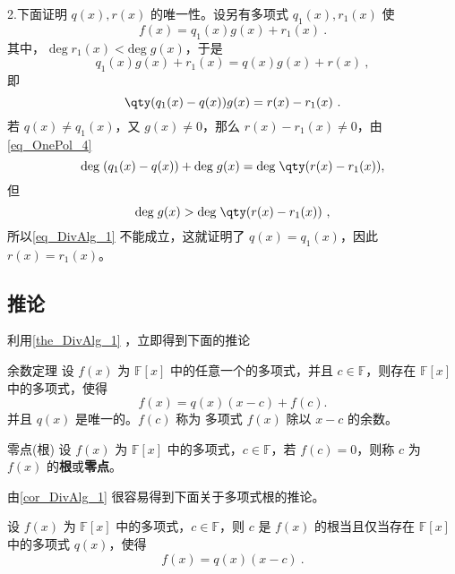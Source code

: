 2.下面证明 $q(x),r(x)$ 的唯一性。设另有多项式 $q_1(x),r_1(x)$ 使
\begin{equation}
f(x)=q_1(x)g(x)+r_1(x)~.
\end{equation}
其中， $\mathrm{deg}\;r_1(x)<\mathrm{deg}\;g(x)$，于是
\begin{equation}
q_1(x)g(x)+r_1(x)=q(x)g(x)+r(x)~,
\end{equation}
即
\begin{equation}
\qty(q_1(x)-q(x))g(x)=r(x)-r_1(x)~.
\end{equation}
若 $q(x)\neq q_1(x)$，又 $g(x)\neq 0$，那么 $r(x)-r_1(x)\neq 0$，由\autoref{eq_OnePol_4}~
\begin{equation}\label{eq_DivAlg_1}
\mathrm{deg}\;(q_1(x)-q(x))+\mathrm{deg}\;g(x)=\mathrm{deg}\;\qty(r(x)-r_1(x)),
\end{equation}
但
\begin{equation}
\mathrm{deg}\;g(x)>\mathrm{deg}\;\qty(r(x)-r_1(x))~,
\end{equation}
所以\autoref{eq_DivAlg_1} 不能成立，这就证明了
$q(x)=q_1(x)$，因此 $r(x)=r_1(x)$。
\subsection{推论}
利用\autoref{the_DivAlg_1} ，立即得到下面的推论
\begin{corollary}{余数定理}\label{cor_DivAlg_1}
设 $f(x)$ 为 $\mathbb{F}[x]$ 中的任意一个的多项式，并且 $c\in\mathbb{F}$，则存在 $\mathbb{F}[x]$ 中的多项式，使得
\begin{equation}
f(x)=q(x)(x-c)+f(c).
\end{equation}
并且 $q(x)$ 是唯一的。$f(c)$ 称为 多项式 $f(x)$ 除以 $x-c$ 的余数。
\end{corollary}
\begin{definition}{零点(根)}
设 $f(x)$ 为 $\mathbb{F}[x]$ 中的多项式，$c\in\mathbb{F}$，若 $f(c)=0$，则称 $c$ 为 $f(x)$ 的\textbf{根}或\textbf{零点}。
\end{definition}
由\autoref{cor_DivAlg_1} 很容易得到下面关于多项式根的推论。
\begin{corollary}{}\label{cor_DivAlg_2}
设 $f(x)$ 为 $\mathbb{F}[x]$ 中的多项式，$c\in\mathbb{F}$，则 $c$ 是 $f(x)$ 的根当且仅当存在 $\mathbb{F}[x]$ 中的多项式 $q(x)$，使得
\begin{equation}
f(x)=q(x)(x-c)~.
\end{equation}

\end{corollary}